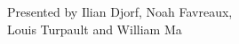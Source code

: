 \documentclass[preview]{standalone}
\begin{document}
\begin{center}
Presented by Ilian Djorf, Noah Favreaux,\\ Louis Turpault and William Ma
\end{center}
\end{document}
